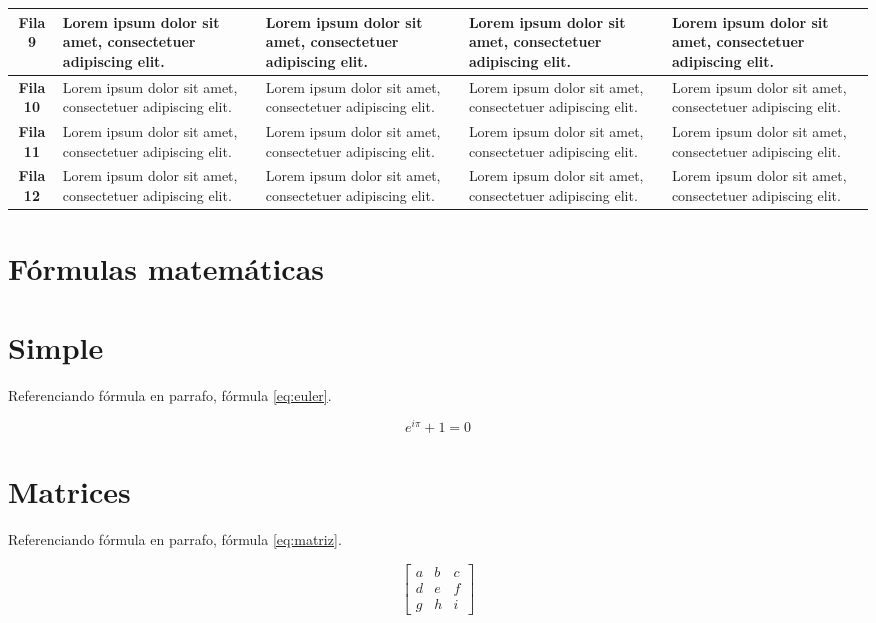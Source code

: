 \begin{longtable}{p{2cm}|p{3cm}|p{3cm}|p{3cm}|p{3cm}|}
    \multicolumn{1}{|c|}{\textbf{Fila 9}} & Lorem ipsum dolor sit amet, consectetuer adipiscing elit. & Lorem ipsum dolor sit amet, consectetuer adipiscing elit. & Lorem ipsum dolor sit amet, consectetuer adipiscing elit. & Lorem ipsum dolor sit amet, consectetuer adipiscing elit. \\ \hline    
    \multicolumn{1}{|c|}{\textbf{Fila 10}} & Lorem ipsum dolor sit amet, consectetuer adipiscing elit. & Lorem ipsum dolor sit amet, consectetuer adipiscing elit. & Lorem ipsum dolor sit amet, consectetuer adipiscing elit. & Lorem ipsum dolor sit amet, consectetuer adipiscing elit. \\ \hline    
    \multicolumn{1}{|c|}{\textbf{Fila 11}} & Lorem ipsum dolor sit amet, consectetuer adipiscing elit. & Lorem ipsum dolor sit amet, consectetuer adipiscing elit. & Lorem ipsum dolor sit amet, consectetuer adipiscing elit. & Lorem ipsum dolor sit amet, consectetuer adipiscing elit. \\ \hline    
    \multicolumn{1}{|c|}{\textbf{Fila 12}} & Lorem ipsum dolor sit amet, consectetuer adipiscing elit. & Lorem ipsum dolor sit amet, consectetuer adipiscing elit. & Lorem ipsum dolor sit amet, consectetuer adipiscing elit. & Lorem ipsum dolor sit amet, consectetuer adipiscing elit. \\ \hline    
\end{longtable}

\section{Fórmulas matemáticas}

\section*{Simple}
Referenciando fórmula en parrafo, fórmula \ref{eq:euler}.

\begin{equation}
    e^{i\pi} + 1 = 0
    \label{eq:euler}
\end{equation}

\section*{Matrices}
Referenciando fórmula en parrafo, fórmula \ref{eq:matriz}.

\begin{equation}
    \left[
    \begin{matrix}
     a & b & c \\
     d & e & f \\
     g & h & i
    \end{matrix}
    \right]
    \label{eq:matriz}
\end{equation}

